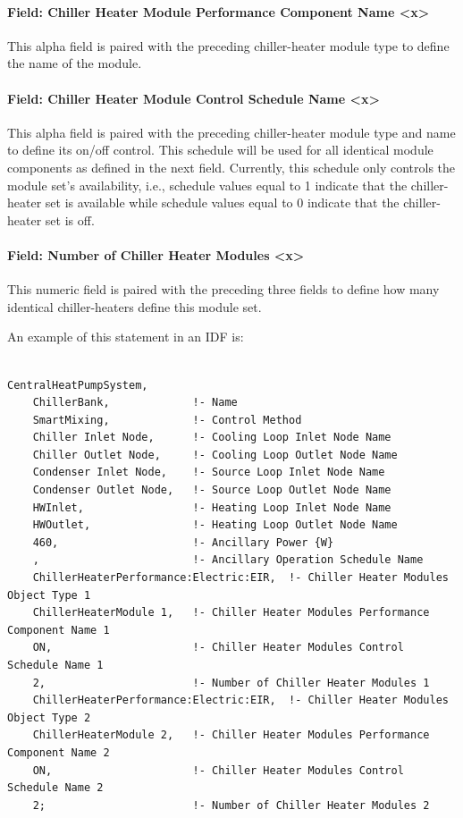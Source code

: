 \paragraph{Field: Chiller Heater Module Performance Component Name \textless{}x\textgreater{}}\label{field-chiller-heater-module-performance-component-name-x}

This alpha field is paired with the preceding chiller-heater module type to define the name of the module.

\paragraph{Field: Chiller Heater Module Control Schedule Name \textless{}x\textgreater{}}\label{field-chiller-heater-module-control-schedule-name-x}

This alpha field is paired with the preceding chiller-heater module type and name to define its on/off control. This schedule will be used for all identical module components as defined in the next field. Currently, this schedule only controls the module set's availability, i.e., schedule values equal to 1 indicate that the chiller-heater set is available while schedule values equal to 0 indicate that the chiller-heater set is off.

\paragraph{Field: Number of Chiller Heater Modules \textless{}x\textgreater{}}\label{field-number-of-chiller-heater-modules-x}

This numeric field is paired with the preceding three fields to define how many identical chiller-heaters define this module set.

An example of this statement in an IDF is:

\begin{lstlisting}

CentralHeatPumpSystem,
    ChillerBank,             !- Name
    SmartMixing,             !- Control Method
    Chiller Inlet Node,      !- Cooling Loop Inlet Node Name
    Chiller Outlet Node,     !- Cooling Loop Outlet Node Name
    Condenser Inlet Node,    !- Source Loop Inlet Node Name
    Condenser Outlet Node,   !- Source Loop Outlet Node Name
    HWInlet,                 !- Heating Loop Inlet Node Name
    HWOutlet,                !- Heating Loop Outlet Node Name
    460,                     !- Ancillary Power {W}
    ,                        !- Ancillary Operation Schedule Name
    ChillerHeaterPerformance:Electric:EIR,  !- Chiller Heater Modules Object Type 1
    ChillerHeaterModule 1,   !- Chiller Heater Modules Performance Component Name 1
    ON,                      !- Chiller Heater Modules Control Schedule Name 1
    2,                       !- Number of Chiller Heater Modules 1
    ChillerHeaterPerformance:Electric:EIR,  !- Chiller Heater Modules Object Type 2
    ChillerHeaterModule 2,   !- Chiller Heater Modules Performance Component Name 2
    ON,                      !- Chiller Heater Modules Control Schedule Name 2
    2;                       !- Number of Chiller Heater Modules 2
\end{lstlisting}


